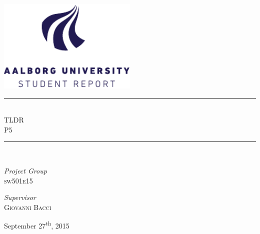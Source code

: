 \begin{titlepage}
\begin{center}
\newcommand{\HRule}{\rule{\linewidth}{0.5mm}}

\includegraphics[width=0.5\textwidth]{aau_logo_en.pdf}~\\[1cm]



\HRule \\[0.4cm]
{ \huge TLDR\\[0.4cm]
  \large \textsc{P5}}

\HRule \\[1.5cm]

\begin{minipage}{0.4\textwidth}
\begin{flushleft} \large
\emph{Project Group}\\
\textsc{sw501e15}
\end{flushleft}
\end{minipage}
\begin{minipage}{0.4\textwidth}
\begin{flushright} \large
\emph{Supervisor} \\
\textsc{Giovanni Bacci}
\end{flushright}
\end{minipage}

\vfill

{\large September 27\textsuperscript{th}, 2015}

\end{center}
\end{titlepage}
